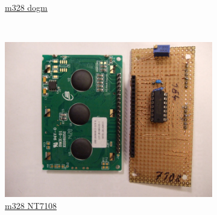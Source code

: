 \documentclass[pdftex,12pt,a4paper,english]{article}
\begin{document}
\begin{figure}[H]
\begin{subfigure}[b]{.3\textwidth}
	  {\href{run:./trunk/mega328_dogm/.}{m328 dogm}}
  \end{subfigure}
~
  \begin{subfigure}[b]{.3\textwidth}	%
    \centering
    \includegraphics[width=1.\textwidth]{../PNG/Adapter_7108.JPG}
	  \\ \vspace{-0.5em}
	  {\href{run:./trunk/mega328_st7108/.}{m328 NT7108}}
  \end{subfigure}
\end{figure}
\end{document}
